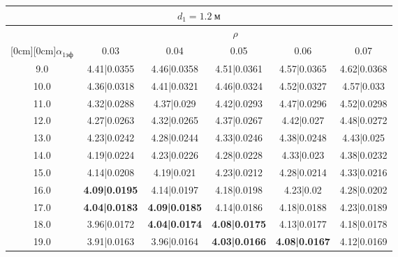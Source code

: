 \documentclass[20pt]{article}
\begin{document}
\begin{center}
\begin{tabular}{c|ccccc}
\hline
	\multicolumn{6}{c}{$d_{1}=1.2 \ м$} \\
\hline
	 & \multicolumn{5}{|c}{$\rho$} \\
	\cline{2-6}
	\raisebox{1.5ex}[0cm][0cm]{$\alpha_{1эф}$} & 0.03 & 0.04 & 0.05 & 0.06 & 0.07\\
\hline
	9.0 & 	4.41|0.0355 & 	4.46|0.0358 & 	4.51|0.0361 & 	4.57|0.0365 & 	4.62|0.0368\\
	10.0 & 	4.36|0.0318 & 	4.41|0.0321 & 	4.46|0.0324 & 	4.52|0.0327 & 	4.57|0.033\\
	11.0 & 	4.32|0.0288 & 	4.37|0.029 & 	4.42|0.0293 & 	4.47|0.0296 & 	4.52|0.0298\\
	12.0 & 	4.27|0.0263 & 	4.32|0.0265 & 	4.37|0.0267 & 	4.42|0.027 & 	4.48|0.0272\\
	13.0 & 	4.23|0.0242 & 	4.28|0.0244 & 	4.33|0.0246 & 	4.38|0.0248 & 	4.43|0.025\\
	14.0 & 	4.19|0.0224 & 	4.23|0.0226 & 	4.28|0.0228 & 	4.33|0.023 & 	4.38|0.0232\\
	15.0 & 	4.14|0.0208 & 	4.19|0.021 & 	4.23|0.0212 & 	4.28|0.0214 & 	4.33|0.0216\\
	16.0 & 	\textbf{4.09|0.0195} & 	4.14|0.0197 & 	4.18|0.0198 & 	4.23|0.02 & 	4.28|0.0202\\
	17.0 & 	\textbf{4.04|0.0183} & 	\textbf{4.09|0.0185} & 	4.14|0.0186 & 	4.18|0.0188 & 	4.23|0.0189\\
	18.0 & 	3.96|0.0172 & 	\textbf{4.04|0.0174} & 	\textbf{4.08|0.0175} & 	4.13|0.0177 & 	4.18|0.0178\\
	19.0 & 	3.91|0.0163 & 	3.96|0.0164 & 	\textbf{4.03|0.0166} & 	\textbf{4.08|0.0167} & 	4.12|0.0169\\
\end{tabular}

\end{center}
\end{document}
